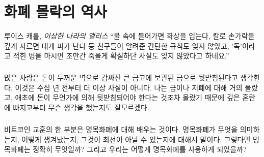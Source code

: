 \chapter{화폐 몰락의 역사}
\label{les:12}

\begin{chapquote}{루이스 캐롤, \textit{이상한 나라의 앨리스}}
	\enquote{불 속에 들어가면 화상을 입는다, 칼로 손가락을 깊게 자르면 대개 피가 난다 등
		친구들이 알려준 간단한 규칙도 잊지 않았고, '독'이라고 적힌 병을 마시면
		조만간 죽을게 확실하단 사실도 잊지 않았다고 하네요.}
\end{chapquote}

\begin{comment}
	Many people think that money is backed by gold, which is locked away in
	big vaults, protected by thick
	walls. This ceased to be true many decades ago. I am not sure what I
	thought, since I was in much deeper trouble, having virtually no
	understanding of gold, paper money, or why it would need to be backed by
	something in the first place.
\end{comment}

\paragraph{}
많은 사람은 돈이 두꺼운 벽으로 감싸진 큰 금고에 보관된 금으로 뒷받침된다고 생각한다. 
이것은 수십 년 전부터 더 이상 사실이 아니다.
나는 금이나 지폐에 대해 거의 몰랐고, 애초에 돈이 무언가에 의해 뒷받침되어야 한다는 것조차 몰랐기 때문에 
깊은 혼란에 빠지고부터 무슨 생각을 했는지도 잘모르겠다.

\begin{comment}
	One part of learning about Bitcoin is learning about fiat money: what it
	means, how it came to be, and why it might not be the best idea we ever
	had. So, what exactly is fiat money? And how did we end up using it?
\end{comment}

\paragraph{}
비트코인 교훈의 한 부분은 명목화폐에 대해 배우는 것이다. 
명목화폐가 무엇을 의미하는지, 어떻게 생겨났는지, 
그것이 최선이 아닐 수 있는지에 대해서 말이다. 
그렇다면 명목화폐는 정확히 무엇일까? 
그리고 우리는 어떻게 명목화폐를 사용하게 되었을까?

\begin{comment}
	If something is imposed by \textit{fiat}, it simply means that it is imposed by
	formal authorization or proposition. Thus, fiat money is money simply
	because \textit{someone} says that it is money. Since all governments use fiat
	currency today, this someone is \textit{your} government. Unfortunately, you
	are not \textit{free} to disagree with this value proposition. You will quickly
	feel that this proposition is everything but non-violent. If you refuse
	to use this paper currency to do business and pay taxes the only people
	you will be able to discuss economics with will be your cellmates.
\end{comment}

